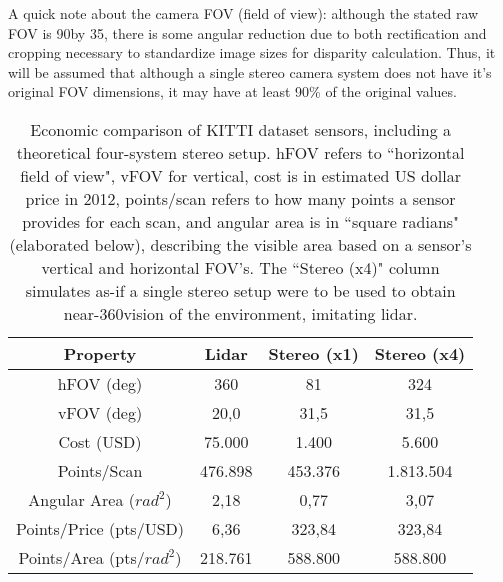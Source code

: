 A quick note about the camera FOV (field of view): although the stated raw FOV is 90\deg by 35\deg, there is some angular reduction due to both rectification and cropping necessary to standardize image sizes for disparity calculation. Thus, it will be assumed that although a single stereo camera system does not have it's original FOV dimensions, it may have at least 90\% of the original values.

\def \b #1{\textbf{#1}} %
\begin{table}[ht]
	\centering
	\caption{Economic comparison of KITTI dataset sensors, including a theoretical four-system stereo setup. hFOV refers to ``horizontal field of view", vFOV for vertical, cost is in estimated US dollar price in 2012, points/scan refers to how many points a sensor provides for each scan, and angular area is in ``square radians" (elaborated below), describing the visible area based on a sensor's vertical and horizontal FOV's. The ``Stereo (x4)" column simulates as-if a single stereo setup were to be used to obtain near-360\deg vision of the environment, imitating lidar.}
	\begin{tabular}{|c|c|c|c|}
	\hline
	\b{Property}              & \b{Lidar} & \b{Stereo (x1)} & \b{Stereo (x4)} \\ \hline
	hFOV (deg)                & 360       & 81              & 324       \\\hline
	vFOV (deg)                & 20,0      & 31,5            & 31,5      \\\hline
	Cost (USD)                & 75.000    & 1.400           & 5.600     \\\hline
	Points/Scan               & 476.898   & 453.376         & 1.813.504 \\\hline
	Angular Area ($rad^2$)    & 2,18      & 0,77            & 3,07      \\\hline
	Points/Price (pts/USD)    & 6,36      & 323,84          & 323,84    \\\hline
	Points/Area (pts/$rad^2$) & 218.761   & 588.800         & 588.800   \\\hline
	\end{tabular}
	\label{economics_table}
\end{table}


